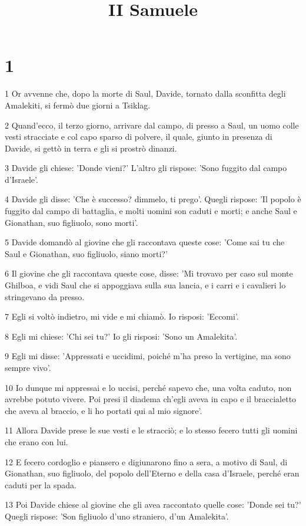 

\title{II Samuele}


\chapter{1}

\par 1 Or avvenne che, dopo la morte di Saul, Davide, tornato dalla sconfitta degli Amalekiti, si fermò due giorni a Tsiklag.
\par 2 Quand'ecco, il terzo giorno, arrivare dal campo, di presso a Saul, un uomo colle vesti stracciate e col capo sparso di polvere, il quale, giunto in presenza di Davide, si gettò in terra e gli si prostrò dinanzi.
\par 3 Davide gli chiese: 'Donde vieni?' L'altro gli rispose: 'Sono fuggito dal campo d'Israele'.
\par 4 Davide gli disse: 'Che è successo? dimmelo, ti prego'. Quegli rispose: 'Il popolo è fuggito dal campo di battaglia, e molti uomini son caduti e morti; e anche Saul e Gionathan, suo figliuolo, sono morti'.
\par 5 Davide domandò al giovine che gli raccontava queste cose: 'Come sai tu che Saul e Gionathan, suo figliuolo, siano morti?'
\par 6 Il giovine che gli raccontava queste cose, disse: 'Mi trovavo per caso sul monte Ghilboa, e vidi Saul che si appoggiava sulla sua lancia, e i carri e i cavalieri lo stringevano da presso.
\par 7 Egli si voltò indietro, mi vide e mi chiamò. Io risposi: 'Eccomi'.
\par 8 Egli mi chiese: 'Chi sei tu?' Io gli risposi: 'Sono un Amalekita'.
\par 9 Egli mi disse: 'Appressati e uccidimi, poiché m'ha preso la vertigine, ma sono sempre vivo'.
\par 10 Io dunque mi appressai e lo uccisi, perché sapevo che, una volta caduto, non avrebbe potuto vivere. Poi presi il diadema ch'egli aveva in capo e il braccialetto che aveva al braccio, e li ho portati qui al mio signore'.
\par 11 Allora Davide prese le sue vesti e le stracciò; e lo stesso fecero tutti gli uomini che erano con lui.
\par 12 E fecero cordoglio e piansero e digiunarono fino a sera, a motivo di Saul, di Gionathan, suo figliuolo, del popolo dell'Eterno e della casa d'Israele, perché eran caduti per la spada.
\par 13 Poi Davide chiese al giovine che gli avea raccontato quelle cose: 'Donde sei tu?' Quegli rispose: 'Son figliuolo d'uno straniero, d'un Amalekita'.
